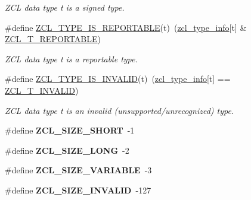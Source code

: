 \begin{DoxyCompactItemize}
\begin{DoxyCompactList}\small\item\em Z\+CL data type {\itshape t} is a signed type. \end{DoxyCompactList}\item 
\mbox{\label{group__zcl__types_ga665e39b52fa49df456f3e218dbb3c3e0}} 
\#define \hyperlink{group__zcl__types_ga665e39b52fa49df456f3e218dbb3c3e0}{Z\+C\+L\+\_\+\+T\+Y\+P\+E\+\_\+\+I\+S\+\_\+\+R\+E\+P\+O\+R\+T\+A\+B\+LE}(t)~(\hyperlink{group__zcl__types_ga0f5737f60f1f37fb3b375e9fd5fe664d}{zcl\+\_\+type\+\_\+info}\mbox{[}t\mbox{]} \& \hyperlink{group__zcl__types_gab0e5c23a0877c17fde12043c85728c29}{Z\+C\+L\+\_\+\+T\+\_\+\+R\+E\+P\+O\+R\+T\+A\+B\+LE})
\begin{DoxyCompactList}\small\item\em Z\+CL data type {\itshape t} is a reportable type. \end{DoxyCompactList}\item 
\mbox{\label{group__zcl__types_ga639712ec7549d1bb6a5bcb05097386e2}} 
\#define \hyperlink{group__zcl__types_ga639712ec7549d1bb6a5bcb05097386e2}{Z\+C\+L\+\_\+\+T\+Y\+P\+E\+\_\+\+I\+S\+\_\+\+I\+N\+V\+A\+L\+ID}(t)~(\hyperlink{group__zcl__types_ga0f5737f60f1f37fb3b375e9fd5fe664d}{zcl\+\_\+type\+\_\+info}\mbox{[}t\mbox{]} == \hyperlink{group__zcl__types_ga7609ed68cf4399cb2c09799ecedfdbe0}{Z\+C\+L\+\_\+\+T\+\_\+\+I\+N\+V\+A\+L\+ID})
\begin{DoxyCompactList}\small\item\em Z\+CL data type {\itshape t} is an invalid (unsupported/unrecognized) type. \end{DoxyCompactList}\item 
\mbox{\label{group__zcl__types_ga755a7e3f73663a35fc1f702956dfca85}} 
\#define {\bfseries Z\+C\+L\+\_\+\+S\+I\+Z\+E\+\_\+\+S\+H\+O\+RT}~-\/1
\item 
\mbox{\label{group__zcl__types_ga74ee31f6a58ad03535546050d04a0de1}} 
\#define {\bfseries Z\+C\+L\+\_\+\+S\+I\+Z\+E\+\_\+\+L\+O\+NG}~-\/2
\item 
\mbox{\label{group__zcl__types_ga8b41a3880f93b53bbae1e241aac4bdb2}} 
\#define {\bfseries Z\+C\+L\+\_\+\+S\+I\+Z\+E\+\_\+\+V\+A\+R\+I\+A\+B\+LE}~-\/3
\item 
\mbox{\label{group__zcl__types_ga18098b4db5dd09f98fdcb5db15cff375}} 
\#define {\bfseries Z\+C\+L\+\_\+\+S\+I\+Z\+E\+\_\+\+I\+N\+V\+A\+L\+ID}~-\/127
\end{DoxyCompactItemize}
